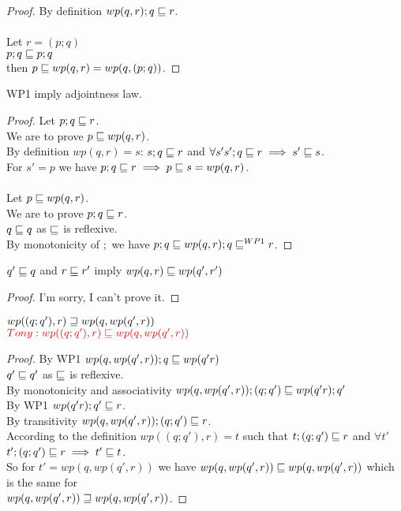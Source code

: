 \documentclass{article}
\begin{document}
\begin{proof}
By definition $wp(q, r); q \sqsubseteq r$.\\
\\
Let $r = (p; q)$\\
$p; q \sqsubseteq p; q$\\
then $p \sqsubseteq wp(q, r) = wp(q, (p; q))$.
\end{proof}

\begin{theorem}
WP1 imply adjointness law.
\end{theorem}

\begin{proof}
Let $p; q \sqsubseteq r$.\\
We are to prove $p \sqsubseteq wp(q, r)$.\\
By definition $wp(q, r) = s$: $s; q \sqsubseteq r$ and $\forall s' s'; q \sqsubseteq r \implies s' \sqsubseteq s$.\\
For $s' = p$ we have $p; q \sqsubseteq r \implies p \sqsubseteq s = wp(q, r)$.\\
\\
Let $p \sqsubseteq wp(q, r)$.\\
We are to prove $p; q \sqsubseteq r$.\\
$q \sqsubseteq q$ as $\sqsubseteq$ is reflexive.\\
By monotonicity of $;$ we have $p; q \sqsubseteq wp(q, r); q \sqsubseteq^{WP1} r$.
\end{proof}


\begin{theorem}[wp monotonicity]
$q' \sqsubseteq q$ and $r \sqsubseteq r'$ imply $wp(q, r) \sqsubseteq wp(q', r')$
\end{theorem}

\begin{proof}
I'm sorry, I can't prove it.
\end{proof}

\begin{theorem}[Stepwise wp]
$wp((q; q'), r) \sqsupseteq wp(q, wp(q', r))$\\
$\color{red} Tony: wp((q; q'), r) \sqsubseteq wp(q, wp(q', r))$
\end{theorem}

\begin{proof}
By WP1 $wp(q, wp(q', r)); q \sqsubseteq wp(q' r)$\\
$q' \sqsubseteq q'$ as $\sqsubseteq$ is reflexive.\\
By monotonicity and associativity $wp(q, wp(q', r)); (q; q') \sqsubseteq wp(q' r); q'$\\
By WP1 $wp(q' r); q' \sqsubseteq r$.\\
By transitivity $wp(q, wp(q', r)); (q; q') \sqsubseteq r$.\\
According to the definition $wp((q; q'), r) = t$ such that $t; (q; q') \sqsubseteq r$ and $\forall t'$ $t'; (q; q') \sqsubseteq r \implies t' \sqsubseteq t$.\\
So for $t' = wp(q, wp(q', r))$ we have $wp(q, wp(q', r)) \sqsubseteq wp(q, wp(q', r))$ which is the same for\\
$wp(q, wp(q', r)) \sqsupseteq wp(q, wp(q', r))$.
\end{proof}
\end{document}
